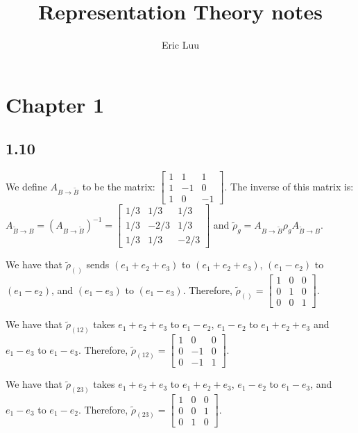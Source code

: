 \documentclass[]{article}
\title{Representation Theory notes}
\author{Eric Luu}
\begin{document}
\maketitle

\section*{Chapter 1}
\subsection*{1.10}
We define $A_{B \rightarrow \tilde{B}}$ to be the matrix:
$
\begin{bmatrix}
	1 & 1 & 1\\
	1 & -1 & 0\\
	1 & 0 & -1
\end{bmatrix}
$.
The inverse of this matrix is:
$A_{\tilde{B} \rightarrow B} = (A_{B \rightarrow \tilde{B}})^{-1} = 
\begin{bmatrix}
	1/3 & 1/3 & 1/3\\
	1/3 & -2/3 & 1/3\\
	1/3 & 1/3 & -2/3
\end{bmatrix}
$
and $\tilde{\rho}_g = A_{B \rightarrow \tilde{B}} \rho_g A_{\tilde{B} \rightarrow B}$. 

We have that $\tilde{\rho}_{()}$ sends $(e_1 + e_2 + e_3)$ to $(e_1 + e_2 + e_3)$, $(e_1 - e_2)$ to $(e_1 - e_2)$, and $(e_1 - e_3)$ to $(e_1 - e_3)$. Therefore, $\tilde{\rho}_{()} = 
\begin{bmatrix}
	1 & 0 & 0\\
	0 & 1 & 0\\
	0 & 0 & 1
\end{bmatrix}
$.

We have that $\tilde{\rho}_{(12)}$ takes $e_1 + e_2 + e_3$ to $e_1 - e_2$, $e_1 - e_2$ to $e_1 + e_2 + e_3$ and $e_1 - e_3$ to $e_1 - e_3$. Therefore, 
$\tilde{\rho}_{(12)} = 
\begin{bmatrix}
	1 & 0 & 0\\
	0 & -1 & 0\\
	0 & -1 & 1
\end{bmatrix}
$.

We have that $\tilde{\rho}_{(23)}$ takes $e_1 + e_2 + e_3$ to $e_1 + e_2 + e_3$, $e_1 - e_2$ to $e_1 - e_3$, and $e_1 - e_3$ to $e_1 - e_2$. Therefore, 
$\tilde{\rho}_{(23)} = 
\begin{bmatrix}
	1 & 0 & 0\\
	0 & 0 & 1\\
	0 & 1 & 0
\end{bmatrix}
$.
\end{document}
